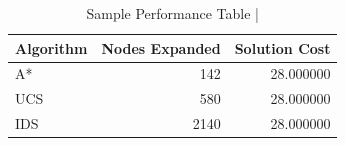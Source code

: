 \begin{table}[htbp]
\centering
\caption{Sample Performance Table | \stampline}
\label{tab:stamp_demo_table}
\begin{tabular}{lrr}
\toprule
Algorithm & Nodes Expanded & Solution Cost \\
\midrule
A* & 142 & 28.000000 \\
UCS & 580 & 28.000000 \\
IDS & 2140 & 28.000000 \\
\bottomrule
\end{tabular}

\end{table}
